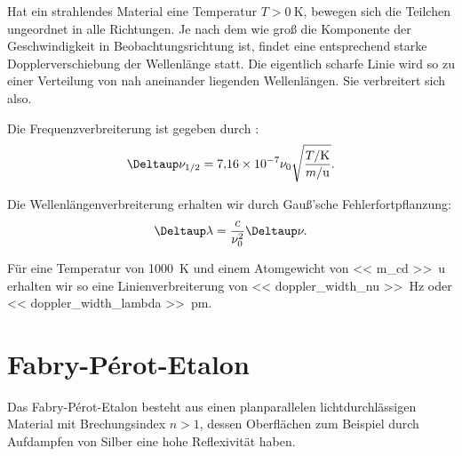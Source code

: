 Hat ein strahlendes Material eine Temperatur $T>\SI{0}{\kelvin}$, bewegen sich
die Teilchen ungeordnet in alle Richtungen. Je nach dem wie groß die Komponente
der Geschwindigkeit in Beobachtungsrichtung ist, findet eine entsprechend
starke Dopplerverschiebung der Wellenlänge statt. Die eigentlich scharfe Linie
wird so zu einer Verteilung von nah aneinander liegenden Wellenlängen. Sie
verbreitert sich also.

Die Frequenzverbreiterung ist gegeben durch
\parencite{chemgapedia/spektrallinien/dopplerverbreiterung}:
\[
    \Deltaup \nu_{1/2} = \num{7.16e-7} \nu_0
    \sqrt{\frac{T / \si\kelvin}{m / \si\atomicmassunit}}.
\]

Die Wellenlängenverbreiterung erhalten wir durch Gauß'sche
Fehlerfortpflanzung:
\[
    \Deltaup \lambda = \frac{c}{\nu_0^2} \Deltaup \nu.
\]

Für eine Temperatur von \SI{1000}{\kelvin} und einem Atomgewicht von \SI{<<
m_cd >>}{\atomicmassunit} \parencite[Umschlag]{meschede-gerthsen_24} erhalten
wir so eine Linienverbreiterung von \SI{<< doppler_width_nu >>}{\hertz} oder
\SI{<< doppler_width_lambda >>}{\pico\meter}.

\section{Fabry-Pérot-Etalon}

Das Fabry-Pérot-Etalon besteht aus einen planparallelen lichtdurchlässigen
Material mit Brechungsindex $n>1$, dessen Oberflächen zum Beispiel durch
Aufdampfen von Silber eine hohe Reflexivität haben.

